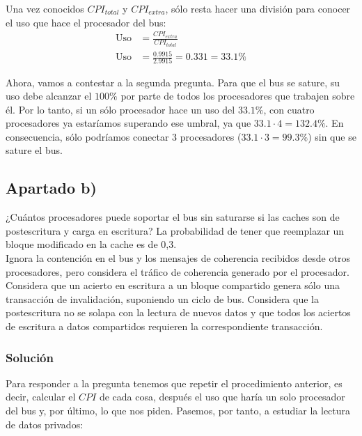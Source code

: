 \documentclass[12pt,a4paper]{article}
\begin{document}
Una vez conocidos $CPI_{total}$ y $CPI_{extra}$, sólo resta hacer una división para conocer el uso que hace el procesador del bus:
\begin{align*}
\text{Uso}&=\frac{CPI_{extra}}{CPI_{total}}\\
\text{Uso}&=\frac{0.9915}{2.9915} = 0.331 = 33.1\%
\end{align*}

Ahora, vamos a contestar a la segunda pregunta. Para que el bus se sature, su uso debe alcanzar el $100\%$ por parte de todos los procesadores que trabajen sobre él. Por lo tanto, si un sólo procesador hace un uso del $33.1\%$, con cuatro procesadores ya estaríamos superando ese umbral, ya que $33.1\cdot 4=132.4\%$. En consecuencia, sólo podríamos conectar 3 procesadores ($33.1\cdot 3=99.3\%$) sin que se sature el bus. 

\subsection{Apartado b)}
¿Cuántos procesadores puede soportar el bus sin saturarse si las caches son de postescritura y carga en escritura? La probabilidad de tener que reemplazar un bloque modificado en la cache es de 0,3. \\

Ignora la contención en el bus y los mensajes de coherencia recibidos desde otros procesadores, pero considera el tráfico de coherencia generado por el procesador. Considera que un acierto en escritura a un bloque compartido genera sólo una transacción de invalidación, suponiendo un ciclo de bus. Considera que la postescritura no se solapa con la lectura de nuevos datos y que todos los aciertos de escritura a datos compartidos requieren la correspondiente transacción.

\subsubsection{Solución}

Para responder a la pregunta tenemos que repetir el procedimiento anterior, es decir, calcular el $CPI$ de cada cosa, después el uso que haría un solo procesador del bus y, por último, lo que nos piden. Pasemos, por tanto, a estudiar la lectura de datos privados:
\end{document}
